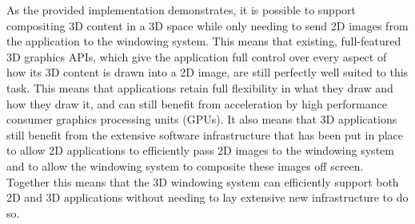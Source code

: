 	As the provided implementation demonstrates, it is possible to support compositing 3D content in a 3D space while only needing to send 2D images from the application to the windowing system. This means that existing, full-featured 3D graphics APIs, which give the application full control over every aspect of how its 3D content is drawn into a 2D image, are still perfectly well suited to this task. This means that applications retain full flexibility in what they draw and how they draw it, and can still benefit from acceleration by high performance consumer graphics processing units (GPUs). It also means that 3D applications still benefit from the extensive software infrastructure that has been put in place to allow 2D applications to efficiently pass 2D images to the windowing system and to allow the windowing system to composite these images off screen. Together this means that the 3D windowing system can efficiently support both 2D and 3D applications without needing to lay extensive new infrastructure to do so.
